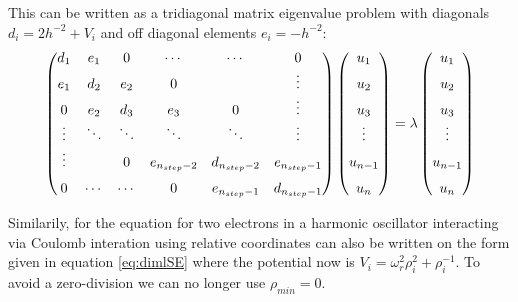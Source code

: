 \documentclass{article} %
\begin{document}
This can be written as a tridiagonal matrix eigenvalue problem with diagonals $d_i=2h^{-2}+V_i$ and off diagonal elements $e_i=-h^{-2}$:
\begin{equation}\label{eq:matrix}
	\begin{pmatrix}
d_1 	& e_1 	& 0 	& \cdots 	& \cdots 	& 0\\
e_1 	& d_2 	& e_2	& 0				&					&\vdots\\
0 		& e_2 	& d_3 & e_3 		& 0 			&\vdots		\\ 
\vdots & \ddots &\ddots &\ddots &\ddots&\vdots\\
\vdots & 			&0		& e_{n_{step}-2} & d_{n_{step}-2} & e_{n_{step}-1}\\
0 		&\cdots &\cdots& 0 			& e_{n_{step}-1}& \vphantom{\vdots}d_{n_{step}-1} 
\end{pmatrix}
\begin{pmatrix}
u_1\vphantom{0}\\u_2\vphantom{\vdots}\\u_3\vphantom{\vdots}\\ \vdots\\u_{n-1}\vphantom{\vdots}\\u_n\vphantom{\vdots}
\end{pmatrix}
=\lambda
\begin{pmatrix}
u_1\vphantom{0}\\ u_2\vphantom{\vdots}\\ u_3\vphantom{\vdots}\\ \vdots\vphantom{\vdots}\\u_{n-1}\vphantom{\vdots}\\ u_n\vphantom{\vdots}
\end{pmatrix}
\end{equation}

%
Similarily, for the equation for two electrons in a harmonic oscillator interacting via Coulomb interation	using relative coordinates can also be written on the form given in equation \eqref{eq:dimlSE} where the potential now is $V_i=\omega_r^2\rho_i^2+\rho_i^{-1}$. To avoid a zero-division we can no longer use $\rho_{min}=0$.
\end{document}
